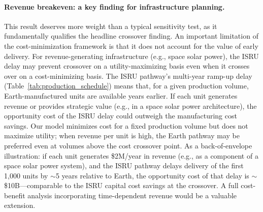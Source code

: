 \documentclass[preprint,12pt]{elsarticle}
\begin{document}
\paragraph{Revenue breakeven: a key finding for infrastructure planning.} This result deserves more weight than a typical sensitivity test, as it fundamentally qualifies the headline crossover finding. An important limitation of the cost-minimization framework is that it does not account for the value of early delivery. For revenue-generating infrastructure (e.g., space solar power), the ISRU delay may prevent crossover on a utility-maximizing basis even when it crosses over on a cost-minimizing basis. The ISRU pathway's multi-year ramp-up delay (Table~\ref{tab:production_schedule}) means that, for a given production volume, Earth-manufactured units are available years earlier. If each unit generates revenue or provides strategic value (e.g., in a space solar power architecture), the opportunity cost of the ISRU delay could outweigh the manufacturing cost savings. Our model minimizes cost for a fixed production volume but does not maximize utility; when revenue per unit is high, the Earth pathway may be preferred even at volumes above the cost crossover point. As a back-of-envelope illustration: if each unit generates \$2M/year in revenue (e.g., as a component of a space solar power system), and the ISRU pathway delays delivery of the first 1{,}000 units by $\sim$5 years relative to Earth, the opportunity cost of that delay is $\sim$\$10B---comparable to the ISRU capital cost savings at the crossover. A full cost-benefit analysis incorporating time-dependent revenue would be a valuable extension.
\end{document}
